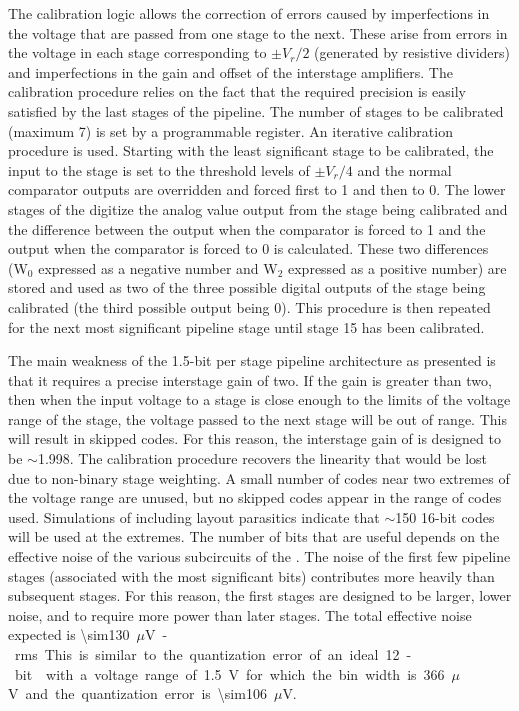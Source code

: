 The calibration logic allows the correction of errors caused by imperfections
in the voltage that are passed from one stage to the next.  These arise from
errors in the voltage in each stage corresponding to $\pm V_r/2$
(generated by resistive dividers) and imperfections in the gain and offset of
the interstage amplifiers.  The calibration procedure relies on the fact that
the required precision is easily satisfied by the last stages of the pipeline.
The number of stages to be calibrated (maximum \num{7}) is set by a programmable
register.  An iterative calibration procedure is used.  Starting with the least
significant stage to be calibrated, the input to the stage is set to the threshold
levels of $\pm V_r/4$ and the normal comparator outputs are overridden
and forced first to \num{1} and then to \num{0}.  The lower stages of the  digitize
the analog value output from the stage being calibrated and the difference between
the  output when the comparator is forced to \num{1} and the 
output when the comparator is forced to \num{0} is calculated.  These two differences
(W$_0$ expressed as a negative number and W$_2$ expressed as a positive number) are
stored and used as two of the three possible digital outputs of the stage being
calibrated (the third possible output being \num{0}).  This procedure is then repeated
for the next most significant pipeline stage until stage \num{15} has been calibrated.

The main weakness of the \num{1.5}-bit per stage pipeline architecture as presented
is that it requires a precise interstage gain of two.  If the gain is greater
than two, then when the input voltage to a stage is close enough to the limits
of the voltage range of the stage, the voltage passed to the next stage will be
out of range.  This will result in skipped  codes.  For this reason,
the interstage gain of  is designed to be $\sim$\num{1.998}.  The
calibration procedure recovers the linearity that would be lost due to
non-binary stage weighting.  A small number of  codes near two
extremes of the voltage range are unused, but no skipped codes appear in the
range of codes used. Simulations of  including layout parasitics 
indicate that $\sim$\num{150} \num{16}-bit codes will be used at the extremes.
The number of  bits that are useful depends on the effective
noise of the various subcircuits of the .  The noise of the first few
pipeline stages (associated with the most significant bits) contributes more
heavily than subsequent stages.  For this reason, the first stages are designed
to be larger, lower noise, and to require more power than later stages.  The total
effective noise expected is \SI{\sim130}{$\mu$V}-rms.  This is similar to the
quantization error of an ideal \num{12}-bit  with a voltage range of
\SI{1.5}{V} for which the bin width is \SI{366}{$\mu$V} and the quantization
error is \SI{\sim106}{$\mu$V}.

